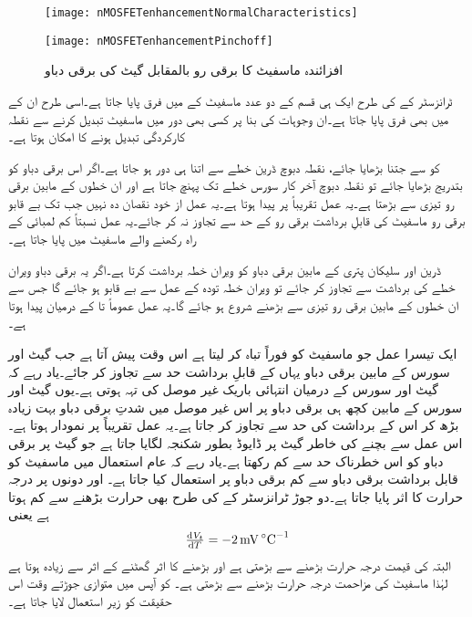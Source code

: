 %
\begin{figure}
\centering
\texttt{[image: nMOSFETenhancementNormalCharacteristics]}
\caption{}
\label{شکل_ماسفیٹ_سادہ_خط}
\end{figure}
%
\begin{figure}
\centering
\texttt{[image: nMOSFETenhancementPinchoff]}
\caption{افزائندہ ماسفیٹ کا برقی رو بالمقابل گیٹ کی برقی دباو}
\label{شکل_ماسفیٹ_دبوچ}
\end{figure}

ٹرانزسٹر کے  کی طرح ایک ہی قسم کے دو عدد ماسفیٹ کے  میں فرق پایا جاتا ہے۔اسی طرح ان کے   میں بھی فرق پایا جاتا ہے۔ان وجوہات کی بنا پر کسی بھی دور میں ماسفیٹ تبدیل کرنے سے نقطہ کارکردگی تبدیل ہونے کا امکان ہوتا ہے۔

 کو   سے جتنا بڑھایا جائے، نقطہ دبوچ ڈرین خطے سے اتنا ہی دور ہو جاتا ہے۔اگر اس برقی دباو کو بتدریج بڑھایا جائے تو نقطہ دبوچ آخر کار سورس خطے تک پہنچ جاتا ہے اور ان خطوں کے مابین برقی رو تیزی سے بڑھتا ہے۔یہ عمل تقریباً  پر پیدا ہوتا ہے۔یہ عمل از خود نقصان دہ نہیں جب تک بے قابو برقی رو ماسفیٹ کی قابلِ برداشت برقی رو کے حد سے تجاوز نہ کر جائے۔یہ عمل نسبتاً کم لمبائی کے راہ رکھنے والے ماسفیٹ میں پایا جاتا ہے۔  

ڈرین اور سلیکان پتری کے مابین برقی دباو کو ویران خطہ برداشت کرتا ہے۔اگر یہ برقی دباو ویران خطے کی برداشت سے تجاوز کر جائے تو ویران خطہ تودہ کے عمل سے بے قابو ہو جائے گا جس سے ان خطوں کے مابین برقی رو تیزی سے بڑھنے شروع ہو جائے گا۔یہ عمل عموماً  تا  کے درمیان پیدا ہوتا ہے۔

ایک تیسرا عمل جو ماسفیٹ کو فوراً تباہ کر لیتا ہے اس  وقت پیش آتا ہے جب گیٹ اور سورس کے مابین برقی دباو یہاں کے قابلِ برداشت حد   سے تجاوز کر جائے۔یاد رہے کہ گیٹ اور سورس کے درمیان انتہائی باریک غیر موصل  کی تہہ ہوتی ہے۔یوں گیٹ اور سورس کے مابین کچھ ہی برقی دباو پر اس غیر موصل میں شدتِ برقی دباو بہت زیادہ بڑھ کر اس کے برداشت کی حد سے تجاوز کر جاتا ہے۔یہ عمل تقریباً   پر نمودار ہوتا ہے۔اس عمل سے بچنے کی خاطر گیٹ پر ڈایوڈ بطور شکنجہ لگایا جاتا ہے جو گیٹ پر برقی دباو کو اس خطرناک حد سے کم رکھتا ہے۔یاد رہے کہ عام استعمال میں  ماسفیٹ کو قابل برداشت برقی دباو سے کم برقی دباو پر استعمال کیا جاتا ہے۔
 اور  دونوں پر درجہ حرارت کا اثر پایا جاتا ہے۔دو جوڑ ٹرانزسٹر کے  کی طرح  بھی حرارت بڑھنے سے کم ہوتا ہے یعنی
\begin{align}
\od{V_t}{T}=\SI{-2}{\milli \volt \per \celsius}
\end{align}
البتہ  کی قیمت درجہ حرارت بڑھنے سے بڑھتی ہے اور  بڑھنے کا اثر  گھٹنے کے اثر سے زیادہ ہوتا ہے لہٰذا ماسفیٹ کی مزاحمت درجہ حرارت بڑھنے سے بڑھتی ہے۔ کو آپس میں متوازی جوڑتے وقت اس حقیقت کو زیر استعمال لایا جاتا ہے۔ 


